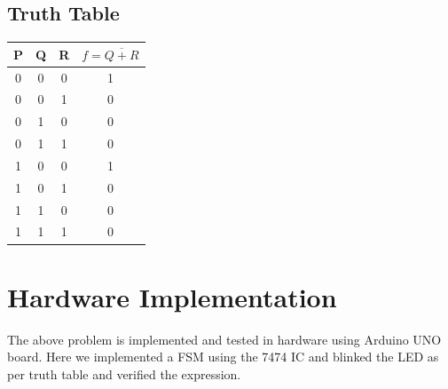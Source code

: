 \documentclass[a4paper,12pt]{article}
\begin{document}
\subsection*{Truth Table}

\begin{center}
\begin{tabular}{|c|c|c|c|}
\hline
P & Q & R & $f = \overline{Q + R}$ \\
\hline
0 & 0 & 0 & 1 \\
0 & 0 & 1 & 0 \\
0 & 1 & 0 & 0 \\
0 & 1 & 1 & 0 \\
1 & 0 & 0 & 1 \\
1 & 0 & 1 & 0 \\
1 & 1 & 0 & 0 \\
1 & 1 & 1 & 0 \\
\hline
\end{tabular}
\end{center}
\section*{\textbf{Hardware Implementation}}
The above problem is implemented and tested in hardware using Arduino UNO board. Here we implemented a FSM using the 7474 IC and blinked the LED as per truth table and verified the expression.
\end{document}
